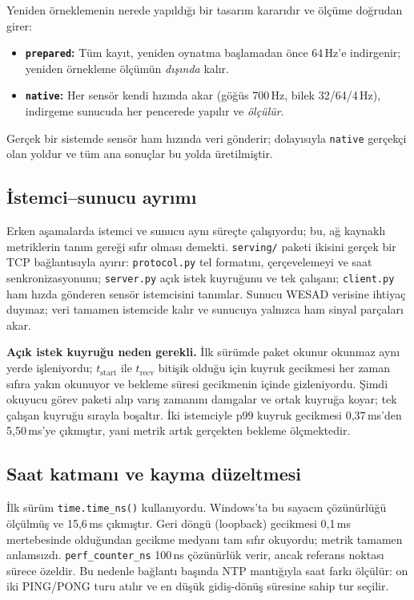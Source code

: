 \documentclass[conference]{IEEEtran}
\newcommand{\ms}{\,ms\xspace}
\begin{document}
Yeniden örneklemenin nerede yapıldığı bir tasarım kararıdır ve ölçüme doğrudan
girer:

\begin{itemize}
\item \textbf{\texttt{prepared}:} Tüm kayıt, yeniden oynatma başlamadan önce
64\,Hz'e indirgenir; yeniden örnekleme ölçümün \emph{dışında} kalır.
\item \textbf{\texttt{native}:} Her sensör kendi hızında akar (göğüs 700\,Hz,
bilek 32/64/4\,Hz), indirgeme sunucuda her pencerede yapılır ve \emph{ölçülür}.
\end{itemize}

Gerçek bir sistemde sensör ham hızında veri gönderir; dolayısıyla
\texttt{native} gerçekçi olan yoldur ve tüm ana sonuçlar bu yolda üretilmiştir.

\subsection{İstemci--sunucu ayrımı}

Erken aşamalarda istemci ve sunucu aynı süreçte çalışıyordu; bu, ağ kaynaklı
metriklerin tanım gereği sıfır olması demekti. \texttt{serving/} paketi ikisini
gerçek bir TCP bağlantısıyla ayırır: \texttt{protocol.py} tel formatını,
çerçevelemeyi ve saat senkronizasyonunu; \texttt{server.py} açık istek kuyruğunu
ve tek çalışanı; \texttt{client.py} ham hızda gönderen sensör istemcisini
tanımlar. Sunucu WESAD verisine ihtiyaç duymaz; veri tamamen istemcide kalır ve
sunucuya yalnızca ham sinyal parçaları akar.

\textbf{Açık istek kuyruğu neden gerekli.} İlk sürümde paket okunur okunmaz aynı
yerde işleniyordu; $t_{\mathrm{start}}$ ile $t_{\mathrm{recv}}$ bitişik olduğu
için kuyruk gecikmesi her zaman sıfıra yakın okunuyor ve bekleme süresi
gecikmenin içinde gizleniyordu. Şimdi okuyucu görev paketi alıp varış zamanını
damgalar ve ortak kuyruğa koyar; tek çalışan kuyruğu sırayla boşaltır. İki
istemciyle p99 kuyruk gecikmesi 0{,}37\ms'den 5{,}50\ms'ye çıkmıştır, yani
metrik artık gerçekten bekleme ölçmektedir.

\subsection{Saat katmanı ve kayma düzeltmesi}
\label{sec:saat}

İlk sürüm \texttt{time.time\_ns()} kullanıyordu. Windows'ta bu sayacın
çözünürlüğü ölçülmüş ve 15{,}6\ms çıkmıştır. Geri döngü (loopback) gecikmesi
0{,}1\ms mertebesinde olduğundan gecikme medyanı tam sıfır okuyordu; metrik
tamamen anlamsızdı. \texttt{perf\_counter\_ns} 100\,ns çözünürlük verir, ancak
referans noktası sürece özeldir. Bu nedenle bağlantı başında NTP mantığıyla saat
farkı ölçülür: on iki PING/PONG turu atılır ve en düşük gidiş-dönüş süresine
sahip tur seçilir.
\end{document}
